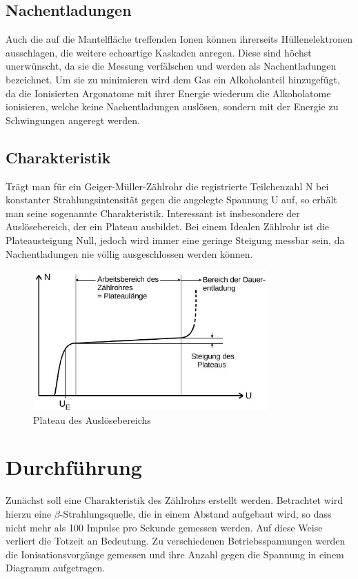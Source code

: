\subsection{Nachentladungen}
Auch die auf die Mantelfläche treffenden Ionen können ihrerseits Hüllenelektronen ausschlagen, die weitere echoartige Kaskaden anregen. Diese sind höchst unerwünscht, da sie die Messung verfälschen und werden als Nachentladungen bezeichnet. Um sie zu minimieren wird dem Gas ein Alkoholanteil hinzugefügt, da die Ionisierten Argonatome mit ihrer Energie wiederum die Alkoholatome ionisieren, welche keine Nachentladungen auslösen, sondern mit der Energie zu Schwingungen angeregt werden.

\subsection{Charakteristik}
Trägt man für ein Geiger-Müller-Zählrohr die registrierte Teilchenzahl N bei konstanter Strahlungsintensität gegen die angelegte Spannung U auf, so erhält man seine sogenannte Charakteristik.
Interessant ist insbesondere der Auslösebereich, der ein Plateau ausbildet. Bei einem Idealen Zählrohr ist die Plateausteigung Null, jedoch wird immer eine geringe Steigung messbar sein, da Nachentladungen nie völlig ausgeschlossen werden können.
\begin{figure}[htbp]
	\includegraphics[width=0.8\textwidth]{pics/plateau.jpg}
	\caption{Plateau des Auslösebereichs}
\end{figure}


\section{Durchführung}
Zunächst soll eine Charakteristik des Zählrohrs erstellt werden. Betrachtet wird hierzu eine $\beta$-Strahlungsquelle, die in einem 
Abstand aufgebaut wird, so dass nicht mehr als 100 Impulse pro Sekunde gemessen werden. Auf diese Weise verliert die Totzeit an Bedeutung.
Zu verschiedenen Betriebsspannungen werden die Ionisationsvorgänge gemessen und ihre Anzahl gegen die Spannung in einem Diagramm 
aufgetragen.

